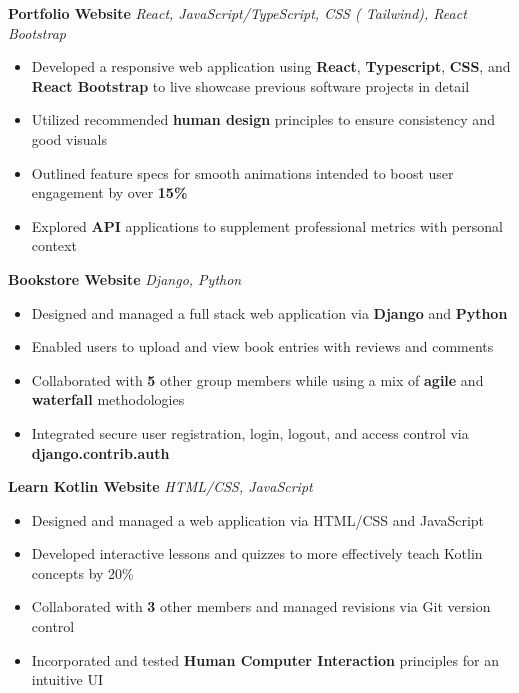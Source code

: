 
\textbf{Portfolio Website {\textbar}}
\textit{
{
React,
JavaScript/TypeScript,
CSS
(
Tailwind),
React Bootstrap
}
}

\begin{itemize}[itemsep=0pt, topsep=0pt]
\item Developed a responsive web application using \textbf{React}, \textbf{Typescript}, \textbf{CSS}, and \textbf{React Bootstrap} to live showcase previous software projects in detail
\item Utilized recommended \textbf{human design} principles to ensure consistency and good visuals
\item Outlined feature specs for smooth animations intended to boost user engagement by over \textbf{15\%}
\item Explored \textbf{API} applications to supplement professional metrics with personal context
\end{itemize}

\textbf{Bookstore Website {\textbar}}
\textit{
{
Django,
Python}
}
\begin{itemize}[itemsep=0pt, topsep=0pt]
\item Designed and managed a full stack web application via \textbf{Django} and \textbf{Python}
\item Enabled users to upload and view book entries with reviews and comments
\item Collaborated with \textbf{5} other group members while using a mix of \textbf{agile} and \textbf{waterfall} methodologies
\item Integrated secure user registration, login, logout, and access control via \textbf{django.contrib.auth}
\end{itemize}

\textbf{Learn Kotlin Website {\textbar}}
\textit{
{
HTML/CSS,
JavaScript}
}
\begin{itemize}[itemsep=0pt, topsep=0pt]
\item Designed and managed a web application via HTML/CSS and JavaScript
\item Developed interactive lessons and quizzes to more effectively teach  Kotlin concepts by 20\%
\item Collaborated with \textbf{3} other members and managed revisions via Git version control
\item Incorporated and tested \textbf{Human Computer Interaction} principles for an intuitive UI
\end{itemize}

